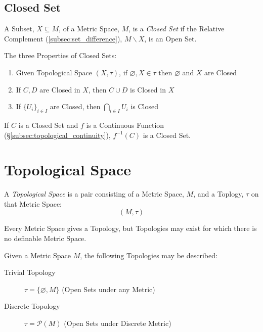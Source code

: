 \documentclass{article}
\begin{document}
\subsection{Closed Set}\label{subsec:closed_set}

A Subset, $X \subseteq M$, of a Metric Space, $M$, is a \emph{Closed
  Set} if the Relative Complement (\ref{subsec:set_difference}), $M
\backslash X$, is an Open Set.

The three Properties of Closed Sets:
\begin{enumerate}
\item Given Topological Space $(X, \tau)$, if $\varnothing, X \in
  \tau$ then $\varnothing$ and $X$ are Closed
\item If $C, D$ are Closed in $X$, then $C \cup D$ is Closed in $X$
\item If $\{ U_i \}_{i \in I}$ are Closed, then $\bigcap_{i \in I}
  U_i$ is Closed
\end{enumerate}

If $C$ is a Closed Set and $f$ is a Continuous Function
(\S\ref{subsec:topological_continuity}), $f^{-1}(C)$ is a Closed Set.

\section{Topological Space}\label{sec:topological_space}

A \emph{Topological Space} is a pair consisting of a Metric Space,
$M$, and a Toplogy, $\tau$ on that Metric Space:
\[
    (M,\tau)
\]

Every Metric Space gives a Topology, but Topologies may exist for
which there is no definable Metric Space. %

Given a Metric Space $M$, the following Topologies may be described:
\begin{description}
\item[Trivial Topology] $\tau = \{\varnothing, M\}$ (Open Sets under
  any Metric)

\item[Discrete Topology] $\tau = \mathcal{P}(M)$ (Open Sets under
  Discrete Metric)
\end{description}
\end{document}
